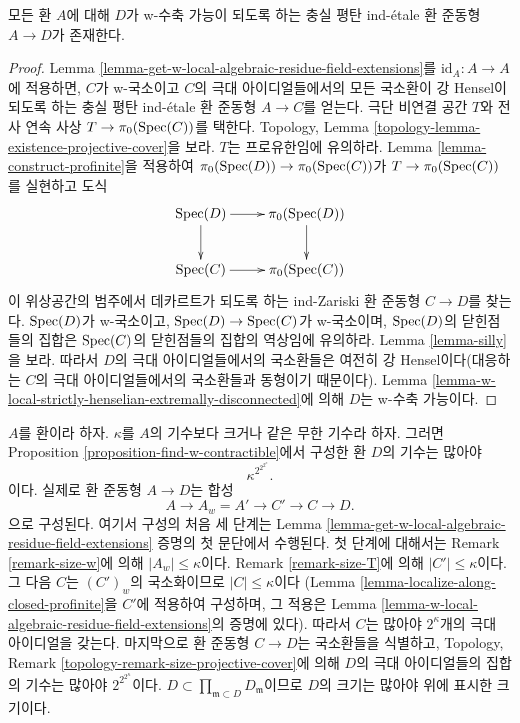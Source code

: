 \begin{proposition}
\label{proposition-find-w-contractible}
모든 환 $A$에 대해 $D$가 w-수축 가능이 되도록 하는 충실 평탄
ind-\'etale 환 준동형 $A \to D$가 존재한다.
\end{proposition}

\begin{proof}
Lemma \ref{lemma-get-w-local-algebraic-residue-field-extensions}를
$\text{id}_A : A \to A$에 적용하면, $C$가 w-국소이고 $C$의 극대
아이디얼들에서의 모든 국소환이 강 Hensel이 되도록 하는 충실 평탄
ind-\'etale 환 준동형 $A \to C$를 얻는다.
극단 비연결 공간 $T$와 전사 연속 사상
$T \to \pi_0(\mathop{\mathrm{Spec}}(C))$를 택한다. Topology, Lemma
\ref{topology-lemma-existence-projective-cover}을 보라.
$T$는 프로유한임에 유의하라. Lemma \ref{lemma-construct-profinite}을
적용하여 $\pi_0(\mathop{\mathrm{Spec}}(D)) \to \pi_0(\mathop{\mathrm{Spec}}(C))$가
$T \to \pi_0(\mathop{\mathrm{Spec}}(C))$를 실현하고 도식
$$
\xymatrix{
\Spec(D) \ar[r] \ar[d] & \pi_0(\Spec(D)) \ar[d] \\
\Spec(C) \ar[r] & \pi_0(\Spec(C))
}
$$
이 위상공간의 범주에서 데카르트가 되도록 하는 ind-Zariski 환 준동형
$C \to D$를 찾는다. $\mathop{\mathrm{Spec}}(D)$가 w-국소이고,
$\mathop{\mathrm{Spec}}(D) \to \mathop{\mathrm{Spec}}(C)$가 w-국소이며, $\mathop{\mathrm{Spec}}(D)$의 닫힌점들의 집합은
$\mathop{\mathrm{Spec}}(C)$의 닫힌점들의 집합의 역상임에 유의하라.
Lemma \ref{lemma-silly}을 보라. 따라서 $D$의 극대 아이디얼들에서의
국소환들은 여전히 강 Hensel이다(대응하는 $C$의 극대 아이디얼들에서의
국소환들과 동형이기 때문이다). Lemma
\ref{lemma-w-local-strictly-henselian-extremally-disconnected}에 의해
$D$는 w-수축 가능이다.
\end{proof}

\begin{remark}
\label{remark-size-w-contractible}
$A$를 환이라 하자. $\kappa$를 $A$의 기수보다 크거나 같은 무한 기수라 하자.
그러면 Proposition \ref{proposition-find-w-contractible}에서 구성한 환
$D$의 기수는 많아야
$$
\kappa^{2^{2^{2^\kappa}}}.
$$
이다. 실제로 환 준동형 $A \to D$는 합성
$$
A \to A_w = A' \to C' \to C \to D.
$$
으로 구성된다. 여기서 구성의 처음 세 단계는 Lemma
\ref{lemma-get-w-local-algebraic-residue-field-extensions} 증명의
첫 문단에서 수행된다. 첫 단계에 대해서는 Remark
\ref{remark-size-w}에 의해 $|A_w| \leq \kappa$이다.
Remark \ref{remark-size-T}에 의해 $|C'| \leq \kappa$이다.
그 다음 $C$는 $(C')_w$의 국소화이므로 $|C| \leq \kappa$이다
(Lemma \ref{lemma-localize-along-closed-profinite}을 $C'$에 적용하여
구성하며, 그 적용은 Lemma
\ref{lemma-w-local-algebraic-residue-field-extensions}의 증명에 있다).
따라서 $C$는 많아야 $2^\kappa$개의
극대 아이디얼을 갖는다. 마지막으로 환 준동형 $C \to D$는
국소환들을 식별하고, Topology, Remark
\ref{topology-remark-size-projective-cover}에 의해 $D$의 극대
아이디얼들의 집합의 기수는 많아야 $2^{2^{2^\kappa}}$이다.
$D \subset \prod_{\mathfrak m \subset D} D_\mathfrak m$이므로
$D$의 크기는 많아야 위에 표시한 크기이다.
\end{remark}

